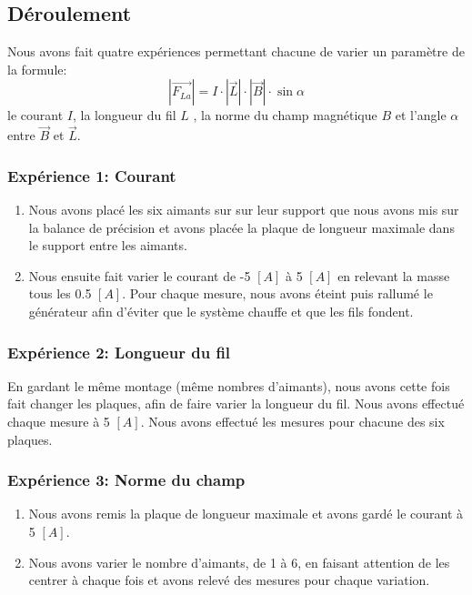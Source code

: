 \documentclass[11pt]{article}
\begin{document}
    \subsection{Déroulement}\label{subsec:deroulement}

    Nous avons fait quatre expériences permettant chacune de varier un paramètre de la formule:
    \[|\vec{F_{La}}|=I\cdot|\vec{L}|\cdot|\vec{B}|\cdot\sin\alpha\]
    le courant $I$, la longueur du fil $L$ , la norme du champ magnétique $B$ et l'angle $\alpha$
    entre $\vec{B}$ et $\vec{L}$.
    \subsubsection{Expérience 1: Courant}
    \begin{enumerate}
        \item Nous avons placé les six aimants sur sur leur support que nous avons mis sur la balance de
        précision et avons placée la plaque de longueur maximale dans le support entre les aimants.
        \item Nous ensuite fait varier le courant de -5 $[A]$ à 5 $[A]$ en relevant la masse tous les
        0.5 $[A]$.
        Pour chaque mesure, nous avons éteint puis rallumé le générateur afin d'éviter que le système
        chauffe et que les fils fondent.
    \end{enumerate}
    \subsubsection{Expérience 2: Longueur du fil}
    En gardant le même montage (même nombres d'aimants), nous avons cette fois fait changer les plaques,
    afin de faire varier la longueur du fil.
    Nous avons effectué chaque mesure à 5 $[A]$.
    Nous avons effectué les mesures pour chacune des six plaques.
    \subsubsection{Expérience 3: Norme du champ}
    \begin{enumerate}
        \item Nous avons remis la plaque de longueur maximale et avons gardé le courant à 5 $[A]$.
        \item Nous avons varier le nombre d'aimants, de 1 à 6, en faisant attention de les centrer à chaque
        fois et avons relevé des mesures pour chaque variation.
    \end{enumerate}
\end{document}

